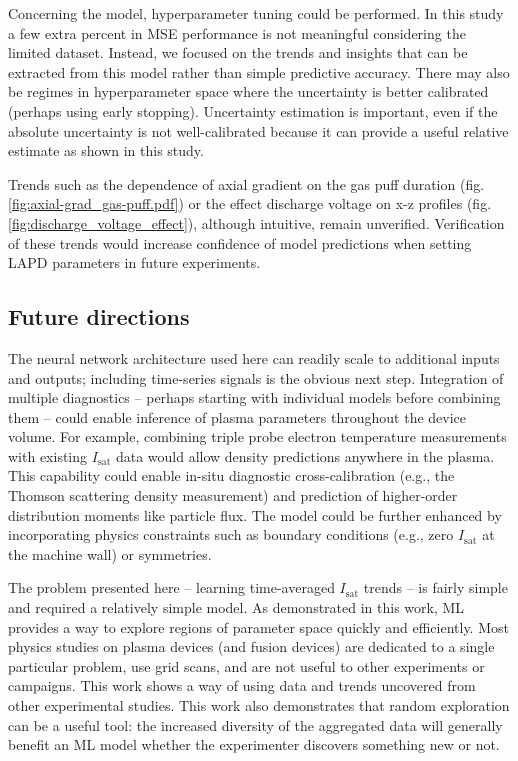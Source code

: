 Concerning the model, hyperparameter tuning could be performed. In this study a few extra percent in MSE performance is not meaningful considering the limited dataset. Instead, we focused on the trends and insights that can be extracted from this model rather than simple predictive accuracy. There may also be regimes in hyperparameter space where the uncertainty is better calibrated (perhaps using early stopping). Uncertainty estimation is important, even if the absolute uncertainty is not well-calibrated because it can provide a useful relative estimate as shown in this study. 

Trends such as the dependence of axial gradient on the gas puff duration (fig. \ref{fig:axial-grad_gas-puff.pdf}) or the effect discharge voltage on x-z profiles (fig. \ref{fig:discharge_voltage_effect}), although intuitive, remain unverified. Verification of these trends would increase confidence of model predictions when setting LAPD parameters in future experiments.

\subsection{Future directions}

The neural network architecture used here can readily scale to additional inputs and outputs; including time-series signals is the obvious next step. Integration of multiple diagnostics -- perhaps starting with individual models before combining them -- could enable inference of plasma parameters throughout the device volume. For example, combining triple probe electron temperature measurements with existing $I_\text{sat}$ data would allow density predictions anywhere in the plasma. This capability could enable in-situ diagnostic cross-calibration (e.g., the Thomson scattering density measurement) and prediction of higher-order distribution moments like particle flux. The model could be further enhanced by incorporating physics constraints such as boundary conditions (e.g., zero $I_\text{sat}$ at the machine wall) or symmetries. 

The problem presented here -- learning time-averaged $I_\text{sat}$ trends -- is fairly simple and required a relatively simple model. As demonstrated in this work, ML provides a way to explore regions of parameter space quickly and efficiently. Most physics studies on plasma devices (and fusion devices) are dedicated to a single particular problem, use grid scans, and are not useful to other experiments or campaigns. This work shows a way of using data and trends uncovered from other experimental studies. This work also demonstrates that random exploration can be a useful tool: the increased diversity of the aggregated data will generally benefit an ML model whether the experimenter discovers something new or not.

